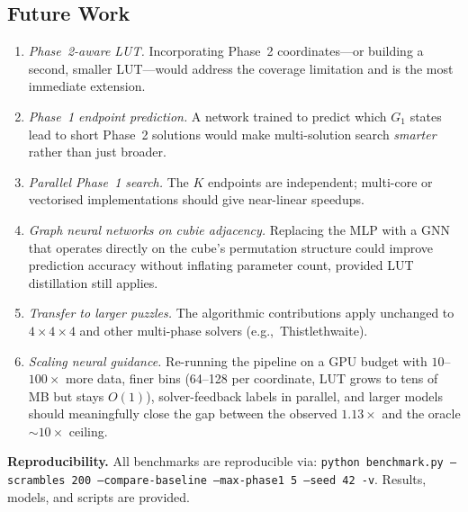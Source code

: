\documentclass[graybox]{svmult}
\begin{document}
\subsection*{Future Work}

\begin{enumerate}[leftmargin=*, itemsep=0.2em]
  \item \emph{Phase~2-aware LUT.} Incorporating Phase~2 coordinates---or building a second, smaller LUT---would address the coverage limitation and is the most immediate extension.
  \item \emph{Phase~1 endpoint prediction.} A network trained to predict which $G_1$ states lead to short Phase~2 solutions would make multi-solution search \emph{smarter} rather than just broader.
  \item \emph{Parallel Phase~1 search.} The $K$ endpoints are independent; multi-core or vectorised implementations should give near-linear speedups.
  \item \emph{Graph neural networks on cubie adjacency.} Replacing the MLP with a GNN that operates directly on the cube's permutation structure could improve prediction accuracy without inflating parameter count, provided LUT distillation still applies.
  \item \emph{Transfer to larger puzzles.} The algorithmic contributions apply unchanged to $4{\times}4{\times}4$ and other multi-phase solvers (e.g.,\ Thistlethwaite).
  \item \emph{Scaling neural guidance.} Re-running the pipeline on a GPU budget with $10$--$100\times$ more data, finer bins (64--128 per coordinate, LUT grows to tens of MB but stays $O(1)$), solver-feedback labels in parallel, and larger models should meaningfully close the gap between the observed $1.13\times$ and the oracle $\sim$$10\times$ ceiling.
\end{enumerate}

\begin{sloppypar}
\textbf{Reproducibility.} All benchmarks are reproducible via: \texttt{python benchmark.py \allowbreak --scrambles 200 --compare-baseline \allowbreak --max-phase1 5 --seed 42 -v}. Results, models, and scripts are provided.
\end{sloppypar}
\end{document}
